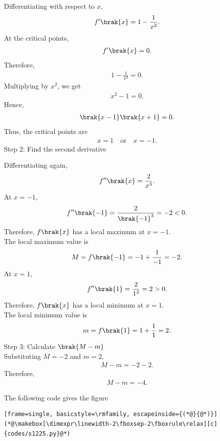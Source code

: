 \begin{enumerate}[label=\thesubsection.\arabic*, ref=\thesubsection.\theenumi]
Differentiating with respect to $x$,
\begin{align}
f'\brak{x}=1-\frac{1}{x^2}.
\end{align}
At the critical points,
\begin{align}
f'\brak{x}=0.
\end{align}
Therefore,
\begin{align}
1-\frac{1}{x^2}=0.
\end{align}
Multiplying by $x^2$, we get
\begin{align}
x^2-1=0.
\end{align}
Hence,
\begin{align}
\brak{x-1}\brak{x+1}=0.
\end{align}
Thus, the critical points are
\begin{align}
x=1 \quad \text{or} \quad x=-1.
\end{align}
{Step 2: Find the second derivative}

Differentiating again,
\begin{align}
f''\brak{x}=\frac{2}{x^3}.
\end{align}
At $x=-1$,
\begin{align}
f''\brak{-1}=\frac{2}{\brak{-1}^3}=-2<0.
\end{align}
Therefore, $f\brak{x}$ has a local maximum at $x=-1$.
\\The local maximum value is
\begin{align}
M=f\brak{-1}=-1+\frac{1}{-1}=-2.
\end{align}
At $x=1$,
\begin{align}
f''\brak{1}=\frac{2}{1^3}=2>0.
\end{align}
Therefore, $f\brak{x}$ has a local minimum at $x=1$.
\\The local minimum value is
\begin{align}
m=f\brak{1}=1+\frac{1}{1}=2.
\end{align}
{Step 3: Calculate $\brak{M-m}$}
\\Substituting $M=-2$ and $m=2$,
\begin{align}
M-m=-2-2.
\end{align}
Therefore,
\begin{align}
M-m=-4.
\end{align}

The following code gives the figure
\begin{lstlisting}[frame=single, basicstyle=\rmfamily, escapeinside={(*@}{@*)}]
(*@\makebox[\dimexpr\linewidth-2\fboxsep-2\fboxrule\relax][c]{codes/s1225.py}@*)
\end{lstlisting}
\begin{figure}[ht]
    \centering


\end{figure}
\end{enumerate}

